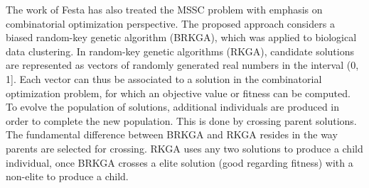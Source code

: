The work of Festa \cite{Festa2013} has also treated the MSSC problem with emphasis on combinatorial optimization perspective. The proposed approach considers a biased random-key genetic algorithm (BRKGA), which was applied to biological data clustering. In random-key genetic algorithms (RKGA), candidate solutions are represented as vectors of randomly generated real numbers in the interval (0, 1]. Each vector can thus be associated to a solution in the combinatorial optimization problem, for which an objective value or fitness can be computed. To evolve the population of solutions, additional individuals are produced in order to complete the new population. This is done by crossing parent solutions. The fundamental difference between BRKGA and RKGA resides in the way parents are selected for crossing. RKGA uses any two solutions to produce a child individual, once BRKGA crosses a elite solution (good regarding fitness) with a non-elite to produce a child.



